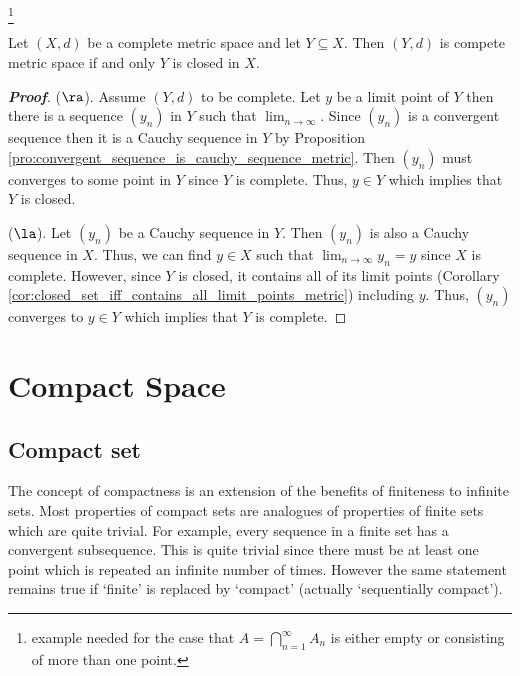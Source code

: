 \footnote{example needed for the case that $A = \bigcap^\infty_{n=1} A_n$ is either empty or consisting of more than one point.}



\begin{proposition}\label{pro:complete_space_subset_complete_iff_closed_metric}
Let $(X,d)$ be a complete metric space and let $Y\subseteq X$. Then $(Y,d)$ is compete metric space if and only $Y$ is closed in $X$.
\end{proposition}

\begin{proof}[\bf Proof]
($\ra$). Assume $(Y,d)$ to be complete. Let $y$ be a limit point of $Y$ then there is a sequence $(y_n)$ in $Y$ such that $\lim_{n\to \infty}$. Since $(y_n)$ is a convergent sequence then it is a Cauchy sequence in $Y$ by Proposition \ref{pro:convergent_sequence_is_cauchy_sequence_metric}. Then $(y_n)$ must converges to some point in $Y$ since $Y$ is complete. Thus, $y\in Y$ which implies that $Y$ is closed.

($\la$). Let $(y_n)$ be a Cauchy sequence in $Y$. Then $(y_n)$ is also a Cauchy sequence in $X$. Thus, we can find $y\in X$ such that $\lim_{n\to \infty} y_n = y$ since $X$ is complete. However, since $Y$ is closed, it contains all of its limit points (Corollary \ref{cor:closed_set_iff_contains_all_limit_points_metric}) including $y$. Thus, $(y_n)$ converges to $y\in Y$ which implies that $Y$ is complete.
\end{proof}




\section{Compact Space}

\subsection{Compact set}

The concept of compactness is an extension of the benefits of finiteness to infinite sets. Most properties of compact sets are analogues of properties of finite sets which are quite trivial. For example, every sequence in a finite set has a convergent subsequence. This is quite trivial since there must be at least one point which is repeated an infinite number of times. However the same statement remains true if `finite' is replaced by `compact' (actually `sequentially compact').


